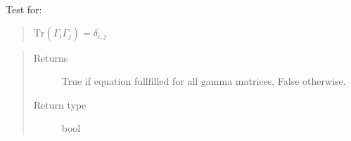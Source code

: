 \documentclass[letterpaper,10pt,english]{sphinxmanual}
\begin{document}
\begin{fulllineitems}
\begin{fulllineitems}
\begin{quote}
\begin{description}
\end{description}\end{quote}

Test for:
\begin{quote}

\(\mathrm{Tr}(\Gamma_i\Gamma_j)= \delta_{i,j}\)
\end{quote}
\begin{quote}\begin{description}
\item[{Returns}] \leavevmode
True if equation fullfilled for all gamma matrices, False otherwise.

\item[{Return type}] \leavevmode
bool

\end{description}\end{quote}

\end{fulllineitems}


\end{fulllineitems}

\end{document}
